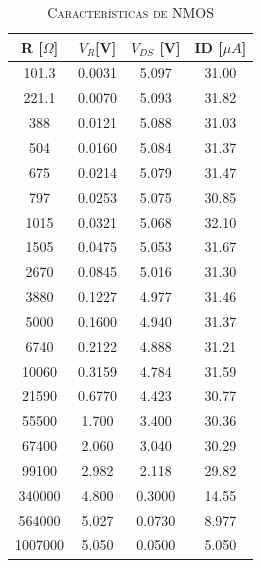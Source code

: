 \documentclass[twocolumn,11pts]{IEEEtran}
\begin{document}
\begin{table}[H]
    \centering
    \caption{\textsc{\footnotesize Características de NMOS}}
    \label{Table 1}
    \begin{tabular}{@{}cccc@{}}
    \toprule
    \toprule
    R {[}$\Omega ${]} & $V_R${[}V{]} & $V_{DS}$ {[}V{]} & ID {[}$\mu A${]} \\ \midrule
    101.3  &  0.0031  &  5.097  &  31.00  \\


  221.1  &  0.0070  &  5.093  &  31.82  \\


  388  &  0.0121  &  5.088  &  31.03  \\


  504  &  0.0160  &  5.084  &  31.37  \\


  675  &  0.0214  &  5.079  &  31.47  \\


  797  &  0.0253  &  5.075  &  30.85  \\


  1015  &  0.0321  &  5.068  &  32.10  \\


  1505  &  0.0475  &  5.053  &  31.67  \\


  2670  &  0.0845  &  5.016  &  31.30  \\


  3880  &  0.1227  &  4.977  &  31.46  \\


  5000  &  0.1600  &  4.940  &  31.37  \\


  6740  &  0.2122  &  4.888  &  31.21  \\


  10060  &  0.3159  &  4.784  &  31.59  \\


  21590  &  0.6770  &  4.423  &  30.77  \\


  55500  &  1.700  &  3.400  &  30.36  \\


  67400  &  2.060  &  3.040  &  30.29  \\


  99100  &  2.982  &  2.118  &  29.82  \\


  340000  &  4.800  &  0.3000  &  14.55  \\


  564000  &  5.027  &  0.0730  &  8.977  \\


  1007000  &  5.050  &  0.0500  &  5.050  \\
    \bottomrule \bottomrule
    \end{tabular}
\end{table}
\end{document}
